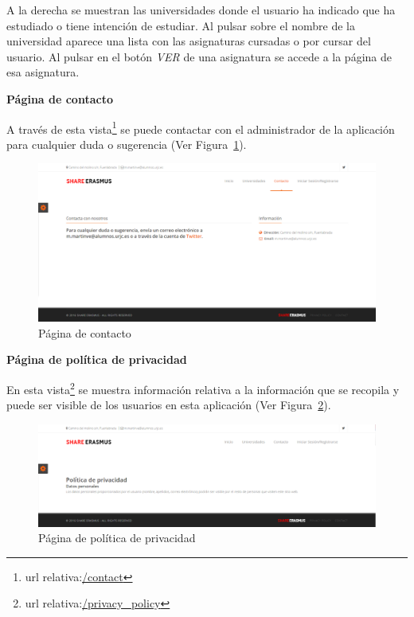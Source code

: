 \documentclass[a4paper, 12pt]{book}
\begin{document}
A la derecha se muestran las universidades donde el usuario ha indicado que ha estudiado o tiene intención de estudiar. Al pulsar sobre el nombre de la universidad aparece una lista con las asignaturas cursadas o por cursar del usuario. Al pulsar en el botón \textit{VER} de una asignatura se accede a la página de esa asignatura.
\newline

{\large  \textbf{Página de contacto}\par}

A través de esta vista\footnote{url relativa:\url{/contact}} se puede contactar con el administrador de la aplicación para cualquier duda o sugerencia (Ver Figura~\ref{fig:contacto}).
\newline

\begin{figure}[H]
  \centering
  \includegraphics[width=16cm, keepaspectratio]{img/contacto.png}
  \caption{Página de contacto}
  \label{fig:contacto}
\end{figure}

{\large  \textbf{Página de política de privacidad}\par}

En esta vista\footnote{url relativa:\url{/privacy_policy}} se muestra información relativa a la información que se recopila y puede ser visible de los usuarios en esta aplicación (Ver Figura~\ref{fig:politica-privacidad}).

\begin{figure}[H]
  \centering
  \includegraphics[width=16cm, keepaspectratio]{img/politica-privacidad.png}
  \caption{Página de política de privacidad}
  \label{fig:politica-privacidad}
\end{figure}
\end{document}
